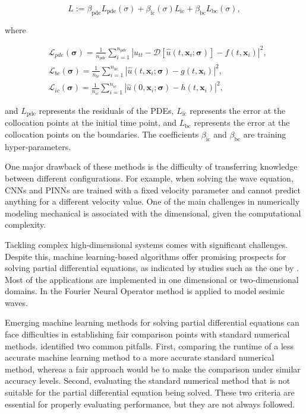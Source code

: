 \documentclass[11pt,twoside]{article}
\begin{document}
$$ L := \beta_{\text{pde}}L_{\text{pde}}(\sigma) + \beta_{\text{ic}}(\sigma) L_{\text{ic}} + 
\beta_{\text{bc}} L_{\text{bc}}(\sigma) ,$$

where

$$
\begin{aligned}
& \mathcal{L}_{pde}(\boldsymbol{\sigma})=\frac{1}{n_{pde}} \sum_{i=1}^{n_{pde}}\left|u_{tt} - \mathcal{D}\left[\hat{u}\left(t,
 \boldsymbol{x}_i ; \boldsymbol{\sigma}\right)\right]-f\left(t, \boldsymbol{x}_i\right)\right|^2, \\
& \mathcal{L}_{bc}(\boldsymbol{\sigma})=\frac{1}{n_{bc}} \sum_{i=1}^{n_{bc}}\left|\hat{u}\left(t, \boldsymbol{x}_i ;
 \boldsymbol{\sigma}\right)-g\left(t, \boldsymbol{x}_i\right)\right|^2, \\
& \mathcal{L}_{ic}(\boldsymbol{\sigma})=\frac{1}{n_{ic}} \sum_{i=1}^{n_{ic}}\left|\hat{u}\left(0, \boldsymbol{x}_i ;
 \boldsymbol{\sigma}\right)-h\left(t,\boldsymbol{x}_i\right)\right|^2,
\end{aligned}
$$

and \( L_{\text{pde}} \) represents the residuals of the PDEs, \( L_{\text{ic}} \) represents the error at the collocation points at the 
initial time point, and \( L_{\text{bc}} \) represents the error at the collocation points on the boundaries. The coefficients 
\(\beta_{\text{ic}}\) and \(\beta_{\text{bc}}\) are training hyper-parameters.

One major drawback of these methods is the difficulty of transferring knowledge between different configurations. For example, when solving 
the wave equation, CNNs and PINNs are trained with a fixed velocity parameter and cannot predict anything for a different velocity value. 
One of the main challenges in numerically modeling mechanical is associated with the dimensional, given the computational complexity.

Tackling complex high-dimensional systems comes with significant challenges. Despite this, machine learning-based algorithms offer promising 
prospects for solving partial differential equations, as indicated by studies such as the one by . 
Most of the applications are implemented in one dimensional or two-dimensional domains. In  the Fourier 
Neural Operator method is applied to model sesimic waves.

Emerging machine learning methods for solving partial differential equations can face difficulties in establishing fair comparison points 
with standard numerical methods. \citeauthor{mcgreivy_weak_2024} identified two common pitfalls. First, comparing the runtime of a less 
accurate machine learning method to a more accurate standard numerical method, whereas a fair approach would be to make the comparison under 
similar accuracy levels. Second, evaluating the standard numerical method that is not suitable for the partial differential equation being 
solved. These two criteria are essential for properly evaluating performance, but they are not always followed. 
 
\end{document}
